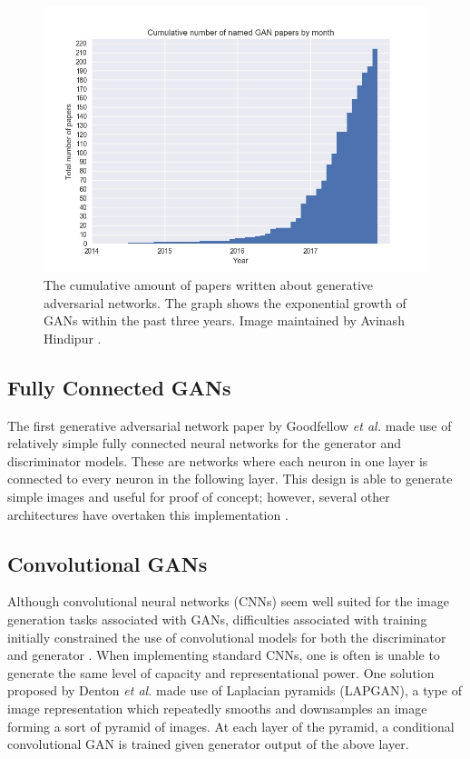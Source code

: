 \documentclass[11pt]{article}
\begin{document}
\begin{figure}
\centering
\includegraphics[scale=0.45]{cumulative_gans}
\caption{The cumulative amount of papers written about generative adversarial networks. The graph shows the exponential growth of GANs within the past three years. Image maintained by Avinash Hindipur \citep{November2017GANZoo}.}
\label{fig:CumulativeNumberofGANPapersbyMonth}
\end{figure}

\subsection{Fully Connected GANs}
The first generative adversarial network paper by Goodfellow \textit{et al.} made use of relatively simple fully connected neural networks for the generator and discriminator models. These are networks where each neuron in one layer is connected to every neuron in the following layer. This design is able to generate simple images and useful for proof of concept; however, several other architectures have overtaken this implementation \citep{2017arXiv171007035C}.

\subsection{Convolutional GANs}
Although convolutional neural networks (CNNs) seem well suited for the image generation tasks associated with GANs, difficulties associated with training initially constrained the use of convolutional models for both the discriminator and generator \citep{2017arXiv171007035C}. When implementing standard CNNs, one is often is unable to generate the same level of capacity and representational power. One solution proposed by Denton \textit{et al.} made use of Laplacian pyramids (LAPGAN), a type of image representation which repeatedly smooths and downsamples an image forming a sort of pyramid of images. At each layer of the pyramid, a conditional convolutional GAN is trained given generator output of the above layer.
\end{document}
